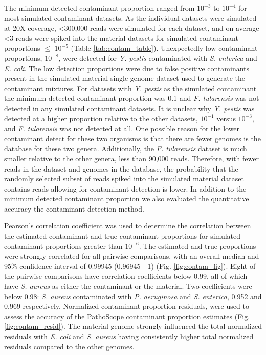 \documentclass[fleqn,10pt,lineno]{wlpeerj}\usepackage[]{graphicx}\usepackage[]{color}
\begin{document}
The minimum detected contaminant proportion ranged from $10^{-3}$ to $10^{-4}$ for most simulated contaminant datasets.
As the individual datasets were simulated at 20X coverage, \textless 300,000 reads were simulated for each dataset, and on average \textless 3 reads were spiked into the material datasets for simulated contaminant proportions $\leq$ $10^{-5}$ (Table \ref{tab:contam_table}).
Unexpectedly low contaminant proportions, $10^{-8}$, were detected for \textit{Y. pestis} contaminated with \textit{S. enterica} and \textit{E. coli}.
The low detection proportions were due to false positive contaminants present in the simulated material single genome dataset used to generate the contaminant mixtures.
For datasets with \textit{Y. pestis} as the simulated contaminant the minimum detected contaminant proportion was 0.1 and \textit{F. tularensis} was not detected in any simulated contaminant datasets.
It is unclear why \textit{Y. pestis} was detected at a higher proportion relative to the other datasets, $10^{-1}$ versus $10^{-3}$, and \textit{F. tularensis} was not detected at all.
One possible reason for the lower contaminant detect for these two organisms is that there are fewer genomes is the database for these two genera.
Additionally, the \textit{F. tularensis} dataset is much smaller relative to the other genera, less than 90,000 reads.
Therefore, with fewer reads in the dataset and genomes in the database, the probability that the randomly selected subset of reads spiked into the simulated material dataset contains reads allowing for contaminant detection is lower.
In addition to the minimum detected contaminant proportion we also evaluated the quantitative accuracy the contaminant detection method.

Pearson's correlation coefficient was used to determine the correlation between the estimated contaminant and true contaminant proportions for simulated contaminant proportions greater than $10^{-6}$.
The estimated and true proportions were strongly correlated for all pairwise comparisons, with an overall median and 95\% confidence interval of 0.99945 (0.96945 - 1) (Fig. \ref{fig:contam_fig}).
Eight of the pairwise comparisons have correlation coefficients below 0.99, all of which have \textit{S. aureus} as either the contaminant or the material.
Two coefficients were below 0.98: \textit{S. aureus} contaminated with \textit{P. aeruginosa} and \textit{S. enterica}, 0.952 and 0.969 respectively.
Normalized contaminant proportion residuals, were used to assess the accuracy of the PathoScope contaminant proportion estimates (Fig. \ref{fig:contam_resid}).
The material genome strongly influenced the total normalized residuals with \textit{E. coli} and \textit{S. aureus} having consistently higher total normalized residuals compared to the other genomes.
\end{document}
